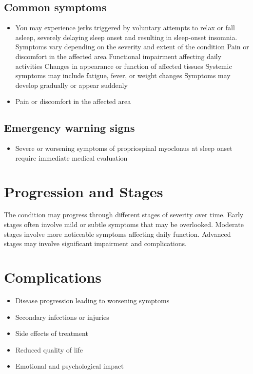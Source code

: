 \subsection{Common symptoms}
\begin{itemize}[noitemsep]
  \item You may experience jerks triggered by voluntary attempts to relax or fall asleep, severely delaying sleep onset and resulting in sleep-onset insomnia. Symptoms vary depending on the severity and extent of the condition Pain or discomfort in the affected area Functional impairment affecting daily activities Changes in appearance or function of affected tissues Systemic symptoms may include fatigue, fever, or weight changes Symptoms may develop gradually or appear suddenly
  \item Pain or discomfort in the affected area
  \end{itemize}

\subsection{Emergency warning signs}
\begin{itemize}[noitemsep]
  \item Severe or worsening symptoms of propriospinal myoclonus at sleep onset require immediate medical evaluation
\end{itemize}
\section{Progression and Stages}
The condition may progress through different stages of severity over time. Early stages often involve mild or subtle symptoms that may be overlooked. Moderate stages involve more noticeable symptoms affecting daily function. Advanced stages may involve significant impairment and complications.
\section{Complications}
\begin{itemize}[noitemsep]
  \item Disease progression leading to worsening symptoms
  \item Secondary infections or injuries
  \item Side effects of treatment
  \item Reduced quality of life
  \item Emotional and psychological impact
\end{itemize}
